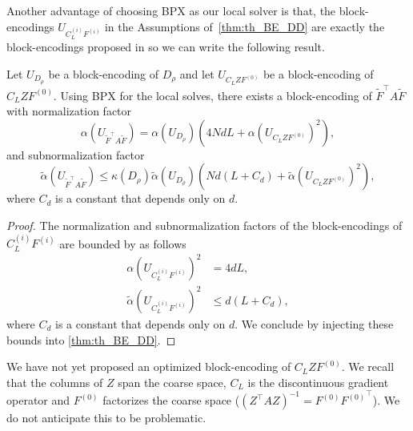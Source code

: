 \documentclass[onefignum,onetabnum]{siamart251216}
\begin{document}
Another advantage of choosing BPX as our local solver is that, the block-encodings $U_{C_L^{(i)} F^{(i)}}$ in the Assumptions of~\ref{thm:th_BE_DD} are exactly the block-encodings proposed in \cite{Deiml_2025} so we can write the following result. 

\begin{theorem}
Let $U_{D_\rho}$ be a block-encoding of $D_\rho$ and let $U_{C_L Z F^{(0)}}$ be a block-encoding of $C_L Z F^{(0)}$. Using BPX for the local solves, there exists a block-encoding of $\tilde{F}^\top A \tilde{F}$ with normalization factor
\begin{equation}
\alpha (U_{\tilde{F}^\top A \tilde{F}}) = \alpha(U_{D_\rho}) \left(4 N d L + \alpha \left(U_{C_L Z F^{(0)}} \right)^2 \right),
\end{equation}
and subnormalization factor
\begin{equation}
\tilde{\alpha} (U_{\tilde{F}^\top A \tilde{F}}) \leq \kappa(D_\rho) \tilde{\alpha}(U_{D_\rho}) \left( N d (L+C_d) + \tilde{\alpha} \left(U_{C_L Z F^{(0)}} \right)^2 \right),
\end{equation}
where $C_d$ is a constant that depends only on $d$.
\label{thm:th_BE_DD_BPX}
\end{theorem}

\begin{proof}
The normalization and subnormalization factors of the block-encodings of $C_L^{(i)} F^{(i)}$ are bounded by \cite[Theorem 6.3]{Deiml_2025} as follows 
\begin{subequations}
\begin{align}
    \alpha\left(U_{C_L^{(i)} F^{(i)}}\right)^2 & = 4dL, \\
    \tilde{\alpha}\left(U_{C_L^{(i)} F^{(i)}}\right)^2 & \leq d(L+C_d),
\end{align}
\end{subequations}
where $C_d$ is a constant that depends only on $d$. We conclude by injecting these bounds into \cref{thm:th_BE_DD}. 
\end{proof}

\begin{remark}
We have not yet proposed an optimized block-encoding of $C_L Z F^{(0)}$. We recall that the columns of $Z$ span the coarse space, $C_L$ is the discontinuous gradient operator and $F^{(0)}$ factorizes the coarse space ($ (Z^\top A Z)^{-1} = F^{(0)} {F^{(0)}}^\top $). We do not anticipate this to be problematic. 
\end{remark}
\end{document}
